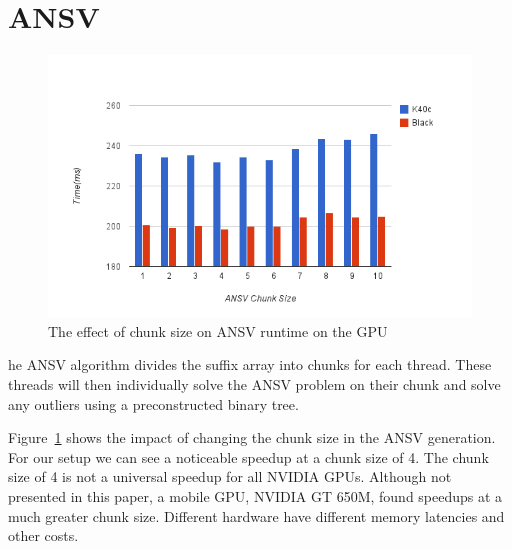 
\section{ANSV}

\begin{figure}[ht!]
\centering
\includegraphics[width=1.0\textwidth]{images/ansvsize.png}
\caption{The effect of chunk size on ANSV runtime on the GPU}
\label{fig:ansvresult}
\end{figure}

he ANSV algorithm divides the suffix array into chunks for each thread.
These threads will then individually solve the ANSV problem on their chunk and solve any outliers using a preconstructed binary tree.

Figure~\ref{fig:ansvresult} shows the impact of changing the chunk size in the ANSV generation.
For our setup we can see a noticeable speedup at a chunk size of 4.
The chunk size of 4 is not a universal speedup for all NVIDIA GPUs.
Although not presented in this paper, a mobile GPU, NVIDIA GT 650M, found speedups at a much greater chunk size.
Different hardware have different memory latencies and other costs.


